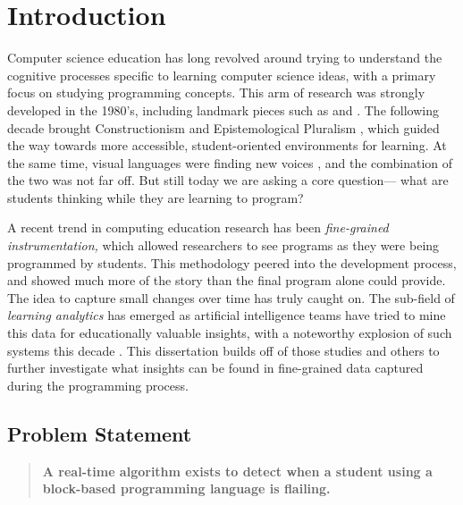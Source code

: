 \chapter{Introduction}

 
Computer science education has long revolved around trying to understand the cognitive processes specific to learning computer science ideas, with a primary focus on studying programming concepts. This arm of research was strongly developed in the 1980's, including landmark pieces such as \citet{duboulay-1986} and \citet{perkins-1986}. The following decade brought Constructionism \citep{papert1991situating} and Epistemological Pluralism \citep{turkle1990epistemological}, which guided the way towards more accessible, student-oriented environments for learning. At the same time, visual languages were finding new voices \citep{raymond-1991}, and the combination of the two was not far off. But still today we are asking a core question--- what are students thinking while they are learning to program?

A recent trend in computing education research has been \emph{fine-grained instrumentation,} which allowed researchers to see programs as they were being programmed by students. This methodology peered into the development process, and showed much more of the story than the final program alone could provide. The idea to capture small changes over time has truly caught on. The sub-field of \emph{learning analytics} has emerged as artificial intelligence teams have tried to mine this data for educationally valuable insights, with a noteworthy explosion of such systems this decade \citep{piech-2012, sudol2012calculating, berland-2013}. This dissertation builds off of those studies and others to further investigate what insights can be found in fine-grained data captured during the programming process. 




\section{Problem Statement} \label{sec:problem-statement}
\begin{quote}
\textbf{A real-time algorithm exists to detect when a student using a block-based programming language is flailing.}
\end{quote}

